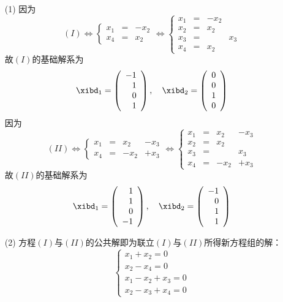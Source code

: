 \begin{jie}
  \begin{itemize}
  \item[(1)]因为
    $$
    (I) \Longleftrightarrow
    \left\{
      \begin{array}{rcr}
        x_1&=&-x_2\\[0.05in]
        x_4&=&x_2
      \end{array}
    \right. \Longleftrightarrow
    \left\{
      \begin{array}{rcrr}
        x_1&=&-x_2&\\[0.05in]
        x_2&=&x_2&\\[0.05in]
        x_3&=&&x_3\\[0.05in]
        x_4&=&x_2&
      \end{array}
    \right. 
    $$   
    故$(I)$的基础解系为
    $$
    \xibd_1=\left(
      \begin{array}{r}
        -1\\1\\0\\1
      \end{array}
    \right), \quad
    \xibd_2=\left(
      \begin{array}{r}
        0\\0\\1\\0
      \end{array}
    \right)
    $$
  因为
  $$
  (II) \Longleftrightarrow
  \left\{
    \begin{array}{rcrr}
      x_1&=&x_2&-x_3\\[0.05in]
      x_4&=&-x_2&+x_3
    \end{array}
  \right. \Longleftrightarrow
  \left\{
    \begin{array}{rcrr}
      x_1&=&x_2&-x_3\\[0.05in]
      x_2&=&x_2&\\[0.05in]
      x_3&=&&x_3\\[0.05in]
      x_4&=&-x_2&+x_3
    \end{array}
  \right. 
  $$
  故$(II)$的基础解系为
  $$
  \xibd_1=\left(
    \begin{array}{r}
      1\\1\\0\\-1
    \end{array}
  \right), \quad
  \xibd_2=\left(
    \begin{array}{r}
      -1\\0\\1\\1
    \end{array}
  \right)
  $$
  \item[(2)] 方程$(I)$与$(II)$的公共解即为联立$(I)$与$(II)$所得新方程组的解：
    $$
    \left\{
      \begin{array}{l}
        x_1+x_2=0\\
        x_2-x_4=0\\
        x_1-x_2+x_3=0\\
        x_2-x_3+x_4=0
      \end{array}
    \right.
    $$


\end{itemize}
\end{jie}
